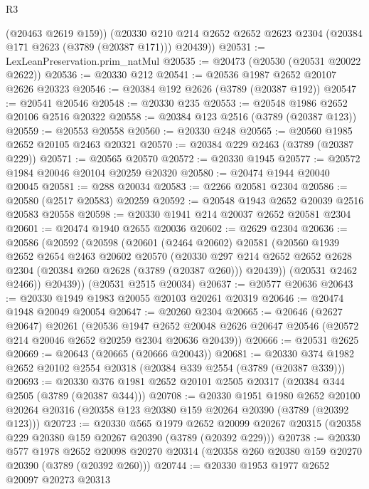 \begin{lexlean}{R3}
\begin{coremodule}
        (@20463 @2619 @159))
      (@20330 @210 @214 @2652 @2652 @2623 @2304 (@20384 @171 @2623 (@3789 (@20387 @171))) @20439))
@20531 := LexLeanPreservation.prim_natMul
@20535 := @20473 (@20530 (@20531 @20022 @2622))
@20536 := @20330 @212
@20541 := @20536 @1987 @2652 @20107 @2626 @20323
@20546 := @20384 @192 @2626 (@3789 (@20387 @192))
@20547 := @20541 @20546
@20548 := @20330 @235
@20553 := @20548 @1986 @2652 @20106 @2516 @20322
@20558 := @20384 @123 @2516 (@3789 (@20387 @123))
@20559 := @20553 @20558
@20560 := @20330 @248
@20565 := @20560 @1985 @2652 @20105 @2463 @20321
@20570 := @20384 @229 @2463 (@3789 (@20387 @229))
@20571 := @20565 @20570
@20572 := @20330 @1945
@20577 := @20572 @1984 @20046 @20104 @20259 @20320
@20580 := @20474 @1944 @20040 @20045
@20581 := @288 @20034
@20583 := @2266 @20581 @2304
@20586 := @20580 (@2517 @20583) @20259
@20592 := @20548 @1943 @2652 @20039 @2516 @20583 @20558
@20598 := @20330 @1941 @214 @20037 @2652 @20581 @2304
@20601 := @20474 @1940 @2655 @20036
@20602 := @2629 @2304
@20636 := @20586
    (@20592
      (@20598
        (@20601
          (@2464 @20602)
          @20581
          (@20560
            @1939
            @2652
            @2654
            @2463
            @20602
            @20570
            (@20330
              @297
              @214
              @2652
              @2652
              @2628
              @2304
              (@20384 @260 @2628 (@3789 (@20387 @260)))
              @20439))
          (@20531 @2462 @2466))
        @20439))
    (@20531 @2515 @20034)
@20637 := @20577 @20636
@20643 := @20330 @1949 @1983 @20055 @20103 @20261 @20319
@20646 := @20474 @1948 @20049 @20054
@20647 := @20260 @2304
@20665 := @20646
    (@2627 @20647)
    @20261
    (@20536
      @1947
      @2652
      @20048
      @2626
      @20647
      @20546
      (@20572 @214 @20046 @2652 @20259 @2304 @20636 @20439))
@20666 := @20531 @2625
@20669 := @20643 (@20665 (@20666 @20043))
@20681 := @20330 @374 @1982 @2652 @20102 @2554 @20318 (@20384 @339 @2554 (@3789 (@20387 @339)))
@20693 := @20330 @376 @1981 @2652 @20101 @2505 @20317 (@20384 @344 @2505 (@3789 (@20387 @344)))
@20708 := @20330
    @1951
    @1980
    @2652
    @20100
    @20264
    @20316
    (@20358 @123 @20380 @159 @20264 @20390 (@3789 (@20392 @123)))
@20723 := @20330
    @565
    @1979
    @2652
    @20099
    @20267
    @20315
    (@20358 @229 @20380 @159 @20267 @20390 (@3789 (@20392 @229)))
@20738 := @20330
    @577
    @1978
    @2652
    @20098
    @20270
    @20314
    (@20358 @260 @20380 @159 @20270 @20390 (@3789 (@20392 @260)))
@20744 := @20330 @1953 @1977 @2652 @20097 @20273 @20313

\end{coremodule}
\end{lexlean}

